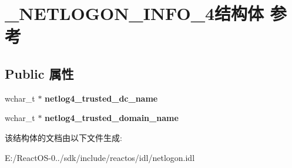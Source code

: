 \hypertarget{struct___n_e_t_l_o_g_o_n___i_n_f_o__4}{}\section{\+\_\+\+N\+E\+T\+L\+O\+G\+O\+N\+\_\+\+I\+N\+F\+O\+\_\+4结构体 参考}
\label{struct___n_e_t_l_o_g_o_n___i_n_f_o__4}
\subsection*{Public 属性}
\begin{DoxyCompactItemize}
\item 
\mbox{\label{struct___n_e_t_l_o_g_o_n___i_n_f_o__4_aae765b1057f0dd24ffd0a4b7777a4c12}} 
wchar\+\_\+t $\ast$ {\bfseries netlog4\+\_\+trusted\+\_\+dc\+\_\+name}
\item 
\mbox{\label{struct___n_e_t_l_o_g_o_n___i_n_f_o__4_a7b5dc351255e6d2c011d6ff5b64d70e3}} 
wchar\+\_\+t $\ast$ {\bfseries netlog4\+\_\+trusted\+\_\+domain\+\_\+name}
\end{DoxyCompactItemize}


该结构体的文档由以下文件生成\+:\begin{DoxyCompactItemize}
\item 
E\+:/\+React\+O\+S-\/0../sdk/include/reactos/idl/netlogon.\+idl\end{DoxyCompactItemize}
